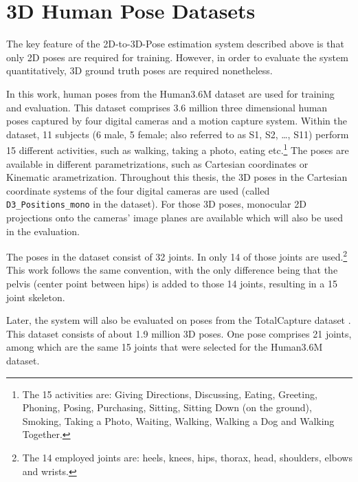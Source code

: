 \section{3D Human Pose Datasets}
\label{sec:data}

The key feature of the 2D-to-3D-Pose estimation system described above is that only 2D poses are required for training.
However, in order to evaluate the system quantitatively, 3D ground truth poses are required nonetheless.

In this work, human poses from the Human3.6M dataset \cite{ionescu14} are used for training and evaluation.
This dataset comprises 3.6 million three dimensional human poses captured by four digital cameras and a motion capture system.
Within the dataset, 11 subjects (6 male, 5 female; also referred to as S1, S2, \dots, S11) perform 15 different activities, such as walking, taking a photo, eating etc.\footnote{
	The 15 activities are: Giving Directions, Discussing, Eating, Greeting, Phoning, Posing, Purchasing, Sitting, Sitting Down (on the ground), Smoking, Taking a Photo, Waiting, Walking, Walking a Dog and Walking Together.
}
The poses are available in different parametrizations, such as Cartesian coordinates or Kinematic arametrization.
Throughout this thesis, the 3D poses in the Cartesian coordinate systems of the four digital cameras are used (called \texttt{D3\_Positions\_mono} in the dataset).
For those 3D poses, monocular 2D projections onto the cameras' image planes are available which will also be used in the evaluation.

The poses in the dataset consist of 32 joints.
In \cite{drover18} only 14 of those joints are used.\footnote{
The 14 employed joints are: heels, knees, hips, thorax, head, shoulders, elbows and wrists.
}
This work follows the same convention, with the only difference being that the pelvis (center point between hips) is added to those 14 joints, resulting in a 15 joint skeleton.

Later, the system will also be evaluated on poses from the TotalCapture dataset \cite{trumble17}.
This dataset consists of about 1.9 million 3D poses.
One pose comprises 21 joints, among which are the same 15 joints that were selected for the Human3.6M dataset.

